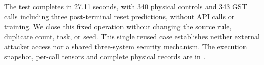 The test completes in 27.11 seconds, with 340 physical controls and 343 GST
calls including three post-terminal reset predictions, without API calls or
training. We close this fixed operation without changing the source rule,
duplicate count, task, or seed. This single reused case establishes neither
external attacker access nor a shared three-system security mechanism.
The execution snapshot, per-call tensors and complete physical records are
in .
